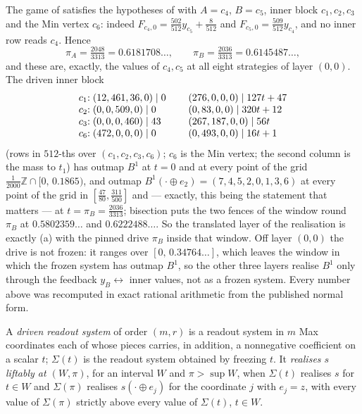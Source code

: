 \begin{proposition}\label{lvl:b2-anatomy}
The game of  satisfies the hypotheses of
 with $A=c_4$, $B=c_5$, inner block $c_1,c_2,c_3$ and
the Min vertex $c_6$: indeed $F_{c_4,0}=\tfrac{502}{512}y_{c_5}+\tfrac{8}{512}$
and $F_{c_5,0}=\tfrac{509}{512}y_{c_4}$, and no inner row reads $c_4$.  Hence
\[
  \pi_A=\tfrac{2048}{3313}=0.6181708\ldots,\qquad
  \pi_B=\tfrac{2036}{3313}=0.6145487\ldots,
\]
and these are, exactly, the values of $c_4,c_5$ at all eight strategies of
layer $(0,0)$.  The driven inner block
\[
\begin{array}{r@{\;}l@{\qquad}r@{\;}l}
 c_1{:}&(12,461,36,0)\mid 0 & &(276,0,0,0)\mid 127t+47\\
 c_2{:}&(0,0,509,0)\mid 0 & &(0,83,0,0)\mid 320t+12\\
 c_3{:}&(0,0,0,460)\mid 43 & &(267,187,0,0)\mid 56t\\
 c_6{:}&(472,0,0,0)\mid 0 & &(0,493,0,0)\mid 16t+1
\end{array}
\]
(rows in $512$-ths over $(c_1,c_2,c_3,c_6)$; $c_6$ is the Min vertex; the
second column is the mass to $t_1$) has outmap $B^{1}$ at $t=0$ and at every point of the grid
$\tfrac1{2000}\mathbb Z\cap[0,\,0.1865)$, and outmap
$B^{1}(\cdot\oplus e_2)=(7,4,5,2,0,1,3,6)$ at every point of the grid in
$[\tfrac{47}{80},\tfrac{311}{500}]$ and --- exactly, this being the statement
that matters --- at $t=\pi_B=\tfrac{2036}{3313}$; bisection puts the two
fences of the window round $\pi_B$ at $0.5802359\ldots$ and $0.6222488\ldots$.  So the translated layer of the
realisation is exactly (a) with the pinned drive
$\pi_B$ inside that window.  Off layer $(0,0)$ the drive is not frozen: it
ranges over $[0,\,0.34764\ldots]$, which leaves the window in which the frozen
system has outmap $B^{1}$, so the other three layers realise $B^{1}$ only
through the feedback $y_B\leftrightarrow$ inner values, not as a frozen system.
Every number above was recomputed in exact rational arithmetic from the
published normal form.
\end{proposition}

\begin{definition}\label{lvl:driven}
A \emph{driven readout system} of order $(m,r)$ is a readout system in $m$ Max
coordinates each of whose pieces carries, in addition, a nonnegative
coefficient on a scalar $t$; $\Sigma(t)$ is the readout system obtained by
freezing $t$.  It \emph{realises $s$ liftably at $(W,\pi)$}, for an interval
$W$ and $\pi>\sup W$, when $\Sigma(t)$ realises $s$ for $t\in W$ and
$\Sigma(\pi)$ realises $s(\cdot\oplus e_{j})$ for the coordinate $j$ with
$e_j=z$, with every value of $\Sigma(\pi)$ strictly above every value of
$\Sigma(t)$, $t\in W$.
\end{definition}

